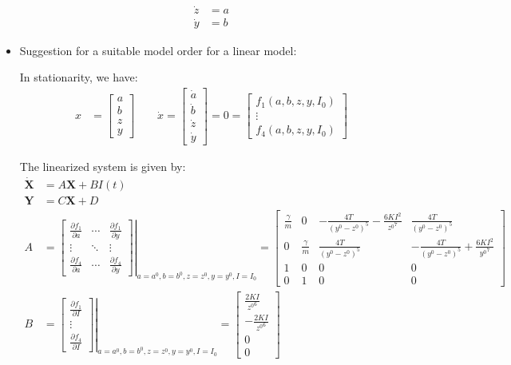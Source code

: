 \documentclass[10pt,a4paper]{article}
\begin{document}
\begin{itemize}
\begin{align}
		\dot{z} &= a \\
		\dot{y} &= b
	\end{align}
	\item Suggestion for a suitable model order for a linear model:
	\par In stationarity, we have:
	\begin{align}
		x &= \begin{bmatrix} a \\ b \\ z \\ y \end{bmatrix} \qquad \dot{x} = \begin{bmatrix} \dot{a} \\ \dot{b} \\ \dot{z} \\ \dot{y} \end{bmatrix} = 0 = \begin{bmatrix} f_{1}(a, b, z, y, I_{0}) \\ \vdots \\ f_{4}(a, b, z, y, I_{0}) \end{bmatrix}
	\end{align}
	\par The linearized system is given by:
	\begin{align}
		\dot{\mathbf{X}} &= A \mathbf{X} + B I(t) \\
		\mathbf{Y} &= C \mathbf{X} + D\\
		A &= \left. \begin{bmatrix} \frac{\partial f_{1}}{\partial a} & \cdots & \frac{\partial f_{1}}{\partial y} \\ \vdots & \ddots & \vdots \\ \frac{\partial f_{4}}{\partial a} & \cdots & \frac{\partial f_{4}}{\partial y} \end{bmatrix} \right|_{a = a^{0}, b = b^{0}, z = z^{0}, y = y^{0}, I = I_{0}} = \begin{bmatrix} \frac{\gamma}{m} & 0 & - \frac{4 T}{(y^{0} - z^{0})^{5}} - \frac{6 K I^{2}}{{z^{0}}^{7}} & \frac{4 T}{(y^{0} - z^{0})^{5}} \\ 0 & \frac{\gamma}{m} & \frac{4 T}{(y^{0} - z^{0})^{5}} & - \frac{4 T}{(y^{0} - z^{0})^{5}} + \frac{6 K I^{2}}{{y^{0}}^{7}} \\ 1 & 0 & 0 & 0 \\ 0 & 1 & 0 & 0 \end{bmatrix} \\ 
		B &= \left. \begin{bmatrix} \frac{\partial f_{1}}{\partial I} \\ \vdots \\ \frac{\partial f_{4}}{\partial I} \end{bmatrix} \right|_{a = a^{0}, b = b^{0}, z = z^{0}, y = y^{0}, I = I_{0}} = \begin{bmatrix} \frac{2 K I}{{z^{0}}^{6}} \\ - \frac{2 K I}{{z^{0}}^{6}} \\ 0 \\ 0 \end{bmatrix} \\

\end{align}
\end{itemize}
\end{document}
